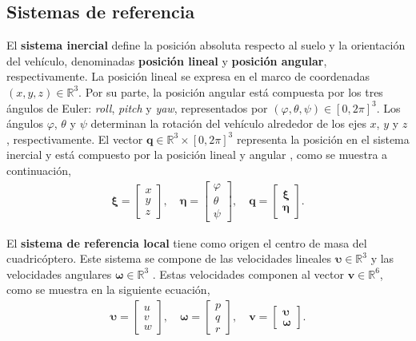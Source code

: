 \subsection{Sistemas de referencia}
El \textbf{sistema inercial} define la posición absoluta respecto al suelo y la orientación del vehículo, denominadas \textbf{posición lineal} y \textbf{posición angular}, respectivamente. La posición lineal se expresa en el marco de coordenadas $(x, y, z)\in\mathbb{R}^3$.
Por su parte, la posición angular está compuesta por los tres ángulos de Euler: \textit{roll}, \textit{pitch} y \textit{yaw}, representados por $(\varphi, \theta, \psi)\in [0, 2\pi]^3$. Los ángulos $\varphi$, $\theta$ y $\psi$ determinan la rotación del vehículo alrededor de los ejes $x$, $y$ y $z$, respectivamente. El vector $\mathbf{q} \in \mathbb{R}^3 \times [0, 2\pi]^3$ representa la posición en el sistema inercial y está compuesto por la posición lineal y angular \cite{capella2020clase}, como se muestra a continuación, 
\begin{align}
\bm{\xi} = 
\begin{bmatrix}
x \\
y\\
z
\end{bmatrix}, 
\quad 
\bm{\eta} = 
\begin{bmatrix}
\varphi \\
\theta \\
\psi 
\end{bmatrix}, 
\quad 
\mathbf{q} = 
\begin{bmatrix}
\bm{\xi}\\
\bm{\eta}
\end{bmatrix}.
\label{eq:position_intertial_system}
\end{align}

El \textbf{sistema de referencia local} tiene como origen el centro de masa del cuadricóptero. Este sistema se compone de las velocidades lineales $\bm{\upsilon}\in\mathbb{R}^3$ y las velocidades angulares $\bm{\omega}\in\mathbb{R}^3$ \cite{capella2020clase}. Estas velocidades componen al vector $\mathbf{v}\in \mathbb{R}^{6}$, como se muestra en la siguiente ecuación,
\begin{align}
\bm{\upsilon} = 
\begin{bmatrix}
    u \\
    v \\
    w
\end{bmatrix},
\quad 
\bm{\omega} = 
\begin{bmatrix}
    p \\
    q\\
    r 
\end{bmatrix},
\quad 
\mathbf{v} = 
\begin{bmatrix}
    \bm{\upsilon} \\
    \bm{\omega}
\end{bmatrix}.
\label{eq:position_local_system}
\end{align}

